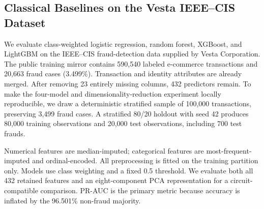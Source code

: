 \subsection{Classical Baselines on the Vesta IEEE--CIS Dataset}
\label{sec:vesta-classical-baselines}

We evaluate class-weighted logistic regression, random forest, XGBoost, and LightGBM on the IEEE--CIS fraud-detection data supplied by Vesta Corporation. The public training mirror contains 590,540 labeled e-commerce transactions and 20,663 fraud cases (3.499\%). Transaction and identity attributes are already merged. After removing 23 entirely missing columns, 432 predictors remain. To make the four-model and dimensionality-reduction experiment locally reproducible, we draw a deterministic stratified sample of 100,000 transactions, preserving 3,499 fraud cases. A stratified 80/20 holdout with seed 42 produces 80,000 training observations and 20,000 test observations, including 700 test frauds.

Numerical features are median-imputed; categorical features are most-frequent-imputed and ordinal-encoded. All preprocessing is fitted on the training partition only. Models use class weighting and a fixed 0.5 threshold. We evaluate both all 432 retained features and an eight-component PCA representation for a circuit-compatible comparison. PR-AUC is the primary metric because accuracy is inflated by the 96.501\% non-fraud majority.

\begin{table}[ht]
\centering
\caption{Classical holdout results on a stratified 100,000-row Vesta sample.}
\label{tab:vesta-classical-results}
\end{table}

